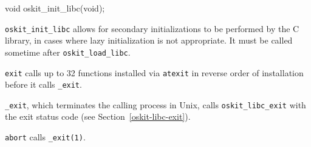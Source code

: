 \begin{apisyn}
         \funcproto void oskit_init_libc(void);
\end{apisyn}
\begin{apidesc}
	\texttt{oskit_init_libc} allows for secondary initializations to be
	performed by the C library, in cases where lazy initialization is
	not appropriate. It must be called sometime after
	\texttt{oskit_load_libc}.
\end{apidesc}



\label{exit}

\begin{apidesc}
	\texttt{exit} calls up to 32 functions installed via 
	\texttt{atexit} in reverse order of installation before
	it calls \texttt{_exit}.

	\texttt{_exit}, which terminates the calling process in Unix,
	calls \texttt{oskit_libc_exit} with the exit status code
	(see Section~\ref{oskit-libc-exit}).
\end{apidesc}

\label{abort}

\begin{apidesc}
	\texttt{abort} calls \texttt{_exit(1)}.
\end{apidesc}
	
\label{panic}


